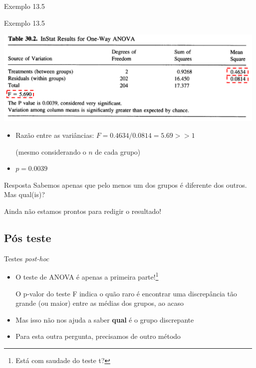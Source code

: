 \documentclass{beamer}
\begin{document}
\begin{frame}[label=exemplo13.5-anova]{\small Exemplo 13.5}
  \begin{exampleblock}{Exemplo 13.5}
    \begin{center}
      \includegraphics[width=\textwidth]{Cap13-30/exemplo13_5-3}
    \end{center}
    \begin{itemize}
      \scriptsize
    \item Razão entre as variâncias: $F = 0.4634/0.0814 = 5.69 >> 1$

      {\tiny (mesmo considerando o $n$ de cada grupo)}
    \item $p=0.0039$
    \end{itemize}
  \end{exampleblock}
\end{frame}

\begin{frame}{}
  \begin{block}{Resposta}
    Sabemos apenas que pelo menos um dos grupos é diferente dos outros.
    Mas qual(is)?

    \bigskip
    Ainda não estamos prontos para redigir o resultado!
  \end{block}
\end{frame}

\subsection{Pós teste}

\begin{frame}{Testes {\em post-hoc}}
  \begin{itemize}
    \footnotesize
  \item O teste de ANOVA é apenas a primeira parte!\footnote{Está com saudade do teste t?}
    \bigskip
    \bigskip
    \begin{block}{}
      O p-valor do teste F indica o quão raro é encontrar uma discrepância tão grande (ou maior) entre as médias dos grupos, ao acaso
    \end{block}
    \bigskip
    \bigskip
  \item Mas isso não nos ajuda a saber {\bf qual} é o grupo discrepante
  \item Para esta outra pergunta, precisamos de outro método
  \end{itemize}
\end{frame}
\end{document}
